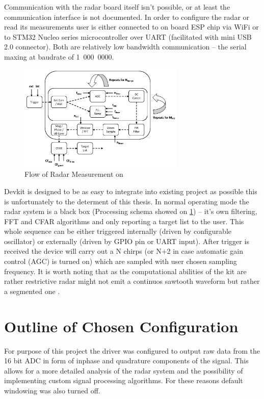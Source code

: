 Communication with the radar board itself isn't possible, or at least  the communication interface is not documented.
In order to configure the radar or read its measurements user is either connected to on board ESP chip via WiFi or to STM32 Nucleo series microcontroller over UART (facilitated with mini USB 2.0 connector).
Both are relatively low bandwidth communication -- the serial maxing at baudrate of 1~000~0000.

\begin{figure}[h!]
	\centering
	\includegraphics[width=0.7\textwidth]{../img/sidar_flow.png}
	\caption[Flow of Radar Measurement on \sidar \cite{sidarPRO}]{Flow of Radar Measurement on \sidar}
	\label{fig:sidarFlow}
\end{figure}

Devkit is designed to be as easy to integrate into existing project as possible this is unfortunately to the determent of this thesis.
In normal operating mode the radar system is a black box (Processing schema showed on \ref{fig:sidarFlow}) -- it's own filtering, FFT and CFAR algorithms and only reporting a target list to the user.
This whole sequence can be either triggered internally (driven by configurable oscillator) or externally (driven by GPIO pin or UART input).
After trigger is received the device will carry out a N chirps (or N+2 in case automatic gain control (AGC) is turned on) which are sampled with user chosen sampling frequency.
It is worth noting that as the computational abilities of the kit are rather restrictive radar might not emit a continuos sawtooth waveform but rather a segmented one \cite{sidarPRO}.

\section{Outline of Chosen Configuration }


For purpose of this project the driver was configured to output raw data from the 16 bit ADC in form of inphase and quadrature components of the signal.
This allows for a more detailed analysis of the radar system and the possibility of implementing custom signal processing algorithms.
For these reasons default windowing was also turned off.

